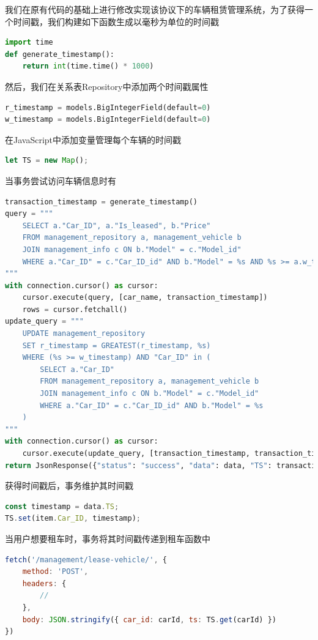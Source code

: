 \documentclass[UTF8,a4paper,12pt]{ctexart}
\begin{document}
我们在原有代码的基础上进行修改实现该协议下的车辆租赁管理系统，为了获得一个时间戳，我们构建如下函数生成以毫秒为单位的时间戳
\begin{lstlisting}[language=Python]
import time
def generate_timestamp():
    return int(time.time() * 1000)
\end{lstlisting}

然后，我们在关系表Repository中添加两个时间戳属性
\begin{lstlisting}[language=Python]
r_timestamp = models.BigIntegerField(default=0)
w_timestamp = models.BigIntegerField(default=0)
\end{lstlisting}

在JavaScript中添加变量管理每个车辆的时间戳
\begin{lstlisting}[language=JavaScript]
let TS = new Map();
\end{lstlisting}

当事务尝试访问车辆信息时有
\begin{lstlisting}[language=Python]
transaction_timestamp = generate_timestamp()
query = """
    SELECT a."Car_ID", a."Is_leased", b."Price"
    FROM management_repository a, management_vehicle b
    JOIN management_info c ON b."Model" = c."Model_id"
    WHERE a."Car_ID" = c."Car_ID_id" AND b."Model" = %s AND %s >= a.w_timestamp
"""
with connection.cursor() as cursor:
    cursor.execute(query, [car_name, transaction_timestamp])
    rows = cursor.fetchall()
update_query = """
    UPDATE management_repository
    SET r_timestamp = GREATEST(r_timestamp, %s)
    WHERE (%s >= w_timestamp) AND "Car_ID" in (
        SELECT a."Car_ID"
        FROM management_repository a, management_vehicle b
        JOIN management_info c ON b."Model" = c."Model_id"
        WHERE a."Car_ID" = c."Car_ID_id" AND b."Model" = %s
    )
"""
with connection.cursor() as cursor:
    cursor.execute(update_query, [transaction_timestamp, transaction_timestamp, car_name])
return JsonResponse({"status": "success", "data": data, "TS": transaction_timestamp})
\end{lstlisting}

获得时间戳后，事务维护其时间戳
\begin{lstlisting}[language=JavaScript]
const timestamp = data.TS;
TS.set(item.Car_ID, timestamp);
\end{lstlisting}

当用户想要租车时，事务将其时间戳传递到租车函数中
\begin{lstlisting}[language=JavaScript]
fetch('/management/lease-vehicle/', {
    method: 'POST',
    headers: {
        //
    },
    body: JSON.stringify({ car_id: carId, ts: TS.get(carId) })  
})
\end{lstlisting}
\end{document}
